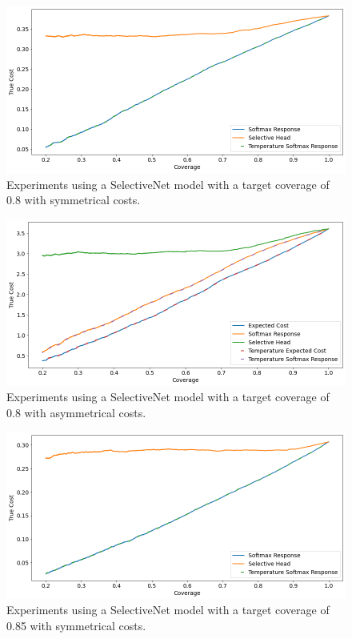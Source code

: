 \begin{figure}[h]
	\includegraphics[width=\textwidth]{images/multi-class/sn0.8-sym.png}
	\caption{Experiments using a SelectiveNet model with a target coverage of 0.8 with symmetrical costs.}
\end{figure}

\begin{figure}[h]
	\includegraphics[width=\textwidth]{images/multi-class/sn0.8-asym.png}
	\caption{Experiments using a SelectiveNet model with a target coverage of 0.8 with asymmetrical costs.}
\end{figure}

\begin{figure}[h]
	\includegraphics[width=\textwidth]{images/multi-class/sn0.85-sym.png}
	\caption{Experiments using a SelectiveNet model with a target coverage of 0.85 with symmetrical costs.}
\end{figure}

